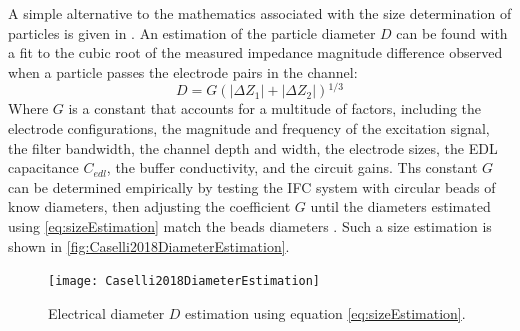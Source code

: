 A simple alternative to the mathematics associated with the size determination of particles is given in \citep{De_Ninno2017,caselli2018novel}. An estimation of the particle diameter $D$ can be found with a fit to the cubic root of the measured impedance magnitude difference observed when a particle passes the electrode pairs in the channel:
\begin{equation}
\label{eq:sizeEstimation}
D = G (\lvert \Delta Z_{1} \rvert+ \lvert \Delta Z_{2} \rvert){^{1/3}}
\end{equation}
Where $G$ is a constant that accounts for a multitude of factors, including the electrode configurations, the magnitude and frequency of the excitation signal, the filter bandwidth, the channel depth and width, the electrode sizes, the EDL capacitance $C_{edl}$, the buffer conductivity, and the circuit gains. Ths constant $G$ can be determined empirically by testing the IFC system with circular beads of know diameters, then adjusting the coefficient $G$ until the diameters estimated using \autoref{eq:sizeEstimation} match the beads diameters \cite{caselli2018novel}. Such a size estimation is shown in \autoref{fig:Caselli2018DiameterEstimation}. \par
\begin{figure}[h]
    \centering
    \texttt{[image: Caselli2018DiameterEstimation]}
    \caption{Electrical diameter $D$ estimation using equation \autoref{eq:sizeEstimation}. \citep{caselli2018novel}}
    \label{fig:Caselli2018DiameterEstimation}
\end{figure}

